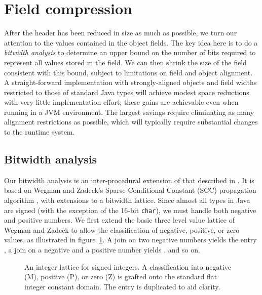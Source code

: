 \documentclass[preprint]{acmconf}
\newcommand{\figscale}{1.0}
\begin{document}
\section{Field compression}
After the header has been reduced in size as much as possible, we turn
our attention to the values contained in the object fields.
The key idea here is to
do a {\it bitwidth analysis} \cite{ananian99:tech,stephenson00}
to determine an upper bound on
the number of bits required to represent all values stored in
the field.  We can then shrink the size of the field consistent with
this bound, subject to
limitations on field and object alignment.  
A straight-forward implementation with strongly-aligned objects and
field widths restricted to those of standard Java types will achieve
modest space reductions with very little implementation effort; these
gains are achievable even when running in a JVM environment.
The largest savings require eliminating as many alignment restrictions
as possible, which will typically require substantial changes to the
runtime system.

\subsection{Bitwidth analysis}
Our bitwidth analysis is an inter-procedural extension of that
described in \cite{ananian99:tech}.  It is based on Wegman and
Zadeck's Sparse Conditional Constant (SCC) propagation algorithm
\cite{wegman91:scc}, with extensions to a bitwidth lattice.
Since almost all types in Java are signed (with the exception of the
16-bit {\tt char}), we must handle both negative and positive numbers.
We first extend the basic three level value lattice of Wegman and
Zadeck to allow the classification of negative, positive, or zero
values, as illustrated in figure~\ref{fig:scclat6}.
A join on two negative numbers yields the entry , a
join on a negative and a positive number yields , and so on.
\begin{figure}
\centering\renewcommand{\figscale}{0.6}
\caption[An integer lattice for signed integers.]
{An integer lattice for signed integers. A classification into
negative (M), positive (P), or zero (Z) is grafted onto the standard
flat integer constant domain.  The  entry is duplicated to
aid clarity.}
\label{fig:scclat6}
\end{figure}
\end{document}

